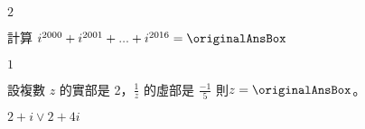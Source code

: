 \begin{QUESTIONS}
\begin{QUESTION}
    \begin{QFROMS}
    \end{QFROMS}
    \begin{QTAGS} \end{QTAGS}
    \begin{QANS}
        $2$
    \end{QANS}
    \begin{QSOL}
    \end{QSOL}
    \begin{QEMPTYSPACE}
    \end{QEMPTYSPACE}
\end{QUESTION}
\begin{QUESTION}
    \begin{QBODY}
        計算 ${{i}^{2000}}+{{i}^{2001}}+...+{{i}^{2016}}= \originalAnsBox $
    \end{QBODY}
    \begin{QFROMS}
    \end{QFROMS}
    \begin{QTAGS} \end{QTAGS}
    \begin{QANS}
        $1$
    \end{QANS}
    \begin{QSOL}
    \end{QSOL}
    \begin{QEMPTYSPACE}
    \end{QEMPTYSPACE}
\end{QUESTION}
\begin{QUESTION}
    \begin{QBODY}
        設複數 $z$ 的實部是 2，$\frac{1}{z}$ 的虛部是 $\frac{-1}{5}$ 則$z=\originalAnsBox$。
    \end{QBODY}
    \begin{QFROMS}
    \end{QFROMS}
    \begin{QTAGS} \end{QTAGS}
    \begin{QANS}
        $2+i \vee 2+4i$
    \end{QANS}
    \begin{QSOL}
    \end{QSOL}
    \begin{QEMPTYSPACE}
    \end{QEMPTYSPACE}
\end{QUESTION}
\begin{QUESTION}
    \begin{QBODY}

\end{QBODY}
\end{QUESTION}
\end{QUESTIONS}
